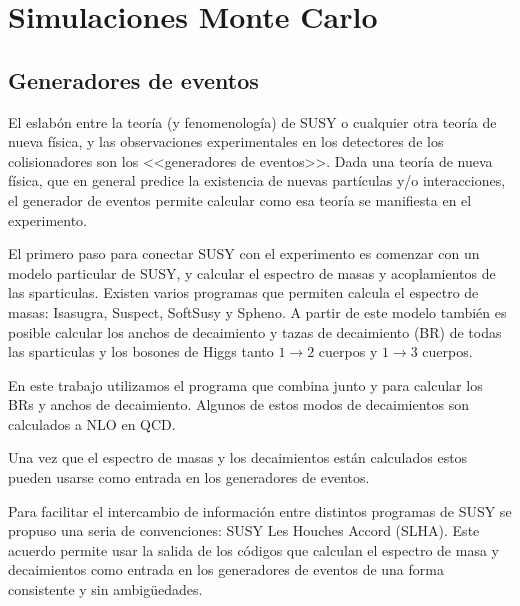 \chapter{Simulaciones Monte Carlo}



\section{Generadores de eventos}

El eslabón entre la teoría (y fenomenología) de SUSY o cualquier otra teoría de
nueva física, y las observaciones experimentales en los detectores de los
colisionadores son los <<generadores de eventos>>. Dada una teoría de nueva
física, que en general predice la existencia de nuevas partículas y/o
interacciones, el generador de eventos permite calcular como esa teoría se
manifiesta en el experimento.

El primero paso para conectar SUSY con el experimento es comenzar con un modelo
particular de SUSY, y calcular el espectro de masas y acoplamientos de las
sparticulas. Existen varios programas que permiten calcula el espectro de masas:
Isasugra, Suspect, SoftSusy y Spheno. A partir de este modelo también es posible
calcular los anchos de decaimiento y tazas de decaimiento (BR) de todas las
sparticulas y los bosones de Higgs tanto $1 \to 2$ cuerpos y $1 \to 3$ cuerpos.

En este trabajo utilizamos el programa {\susyhit} que combina
{\suspect} junto {\sdecay} y {\hdecay} para calcular los BRs y anchos de
decaimiento. Algunos de estos modos de decaimientos son calculados a NLO en QCD.

Una vez que el espectro de masas y los decaimientos están calculados estos
pueden usarse como entrada en los generadores de eventos.

Para facilitar el intercambio de información entre distintos programas de SUSY
se propuso una seria de convenciones: SUSY Les Houches Accord (SLHA)\cite{SLHA}.
Este acuerdo permite usar la salida de los códigos que calculan el espectro de
masa y decaimientos como entrada en los generadores de eventos de una forma
consistente y sin ambigüedades.


